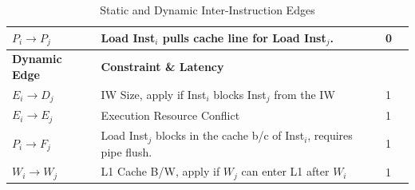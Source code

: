 \begin{table}
\begin{center}
\begin{tabular}{llll}
    $P_{i}\rightarrow P_{j}$ & Load Inst$_i$ pulls cache line for Load Inst$_j$. & 0 \\
    
\bottomrule
\toprule
  \textbf{Dynamic Edge} & \textbf{Constraint \& Latency} \\ \midrule
\rowcolor{CNew}
    $E_{i}\rightarrow D_{j}$ & IW Size, apply if Inst$_i$ blocks Inst$_j$ from the IW & 1 \\
    $E_{i}\rightarrow E_{j}$ & Execution Resource Conflict & 1 \\
\rowcolor{CNew}
    $P_{i}\rightarrow F_{j}$ & Load Inst$_j$ blocks in the cache b/c of Inst$_i$, requires pipe flush.  & 1 \\ 
\rowcolor{CNew}
    $W_{i}\rightarrow W_{j}$ & L1 Cache B/W, apply if $W_j$ can enter L1 after $W_i$  & 1 \\

\bottomrule
\end{tabular}

\caption{Static and Dynamic Inter-Instruction Edges}
\label{tab:prism-edges}
\end{center}

\vspace{-0.05in}
\end{table}





